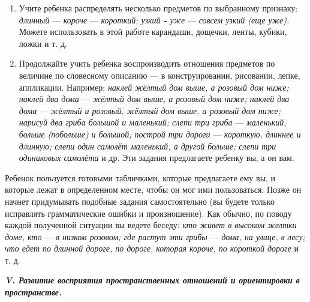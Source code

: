 \documentclass[a5paper]{book}
\renewcommand{\emph}[1]{\textit{#1}}
\begin{document}
\begin{enumerate}
\def\labelenumi{\arabic{enumi}.}
\setcounter{enumi}{3}
\item
  
  Учите ребенка распределять несколько предметов по выбранному признаку:
  \emph{длинный} --- \emph{короче} --- \emph{короткий; узкий \textbf{-}
  уже} --- \emph{совсем узкий (еще уже).} Можете использовать в этой
  работе карандаши, дощечки, ленты, кубики, ложки и т. д.
  
\item
  
  Продолжайте учить ребенка воспроизводить отношения предметов по
  величине по словесному описанию --- в конструировании, рисовании,
  лепке, аппликации. Например: \emph{наклей жёлтый дом выше, а розовый
  дом ниже; наклей два дома} --- \emph{жёлтый дом выше, а розовый дом
  ниже; наклей два дома} --- \emph{жёлтый и розовый, жёлтый дом выше, а
  розовый дом ниже; нарисуй два гриба большой и маленький; слепи три
  гриба} --- \emph{маленький, больше (побольше) и большой; построй три
  дороги} --- \emph{короткую, длиннее и длинную; слепи один самолёт
  маленький, а другой больше; слепи три одинаковых самолёта} и др. Эти
  задания предлагаете ребенку вы, а он вам.
  
\end{enumerate}


Ребенок пользуется готовыми табличками, которые предлагаете ему вы, и
которые лежат в определенном месте, чтобы он мог ими пользоваться. Позже
он начнет придумывать подобные задания самостоятельно (вы будете только
исправлять грамматические ошибки и произношение). Как обычно, по поводу
каждой полученной ситуации вы ведете беседу: \emph{кто живет в высоком
желтки доме, кто} --- \emph{в низком розовом; где растут эти грибы} ---
\emph{дома, на улице, в лесу; что едет по длинной дороге, по дороге,
которая короче, по короткой дороге} и т. д.

\emph{\textbf{V. Развитие восприятия пространственных отношений и
ориентировки в пространстве.}}
\end{document}
